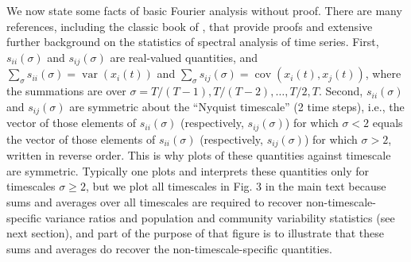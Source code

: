 \documentclass[letterpaper,11pt]{article}
\newcommand{\var}{{\operatorname{var}}}
\newcommand{\cov}{{\operatorname{cov}}}
\begin{document}
We now state some facts of basic Fourier analysis without proof. There are many 
references, including the classic book of \cite{Brillinger2001}, that provide proofs
and extensive further background on the statistics of spectral analysis of time series.
First, $s_{ii}(\sigma)$ and $s_{ij}(\sigma)$ are real-valued quantities, and 
$\sum_\sigma s_{ii}(\sigma) = \var(x_i(t))$ and 
$\sum_\sigma s_{ij}(\sigma) = \cov(x_i(t),x_j(t))$, where the summations are over
$\sigma=T/(T-1),T/(T-2),\ldots,T/2,T$. Second, $s_{ii}(\sigma)$ and $s_{ij}(\sigma)$
are symmetric about the ``Nyquist timescale'' (2 time steps), i.e., 
the vector of those elements of $s_{ii}(\sigma)$ (respectively, $s_{ij}(\sigma)$)
for which $\sigma<2$ equals the vector of those elements of 
$s_{ii}(\sigma)$ (respectively, $s_{ij}(\sigma)$) for which $\sigma>2$, written
in reverse order. This is why plots of these quantities against timescale are 
symmetric. Typically one plots and interprets 
these quantities only for timescales $\sigma \geq 2$,
but we plot all timescales in Fig. 3 in the main text 
because sums and averages over all timescales are 
required to recover non-timescale-specific variance ratios and population
and community variability statistics (see next section), and part of the 
purpose of that figure is to illustrate that these sums and averages do
recover the non-timescale-specific quantities.
\end{document}
